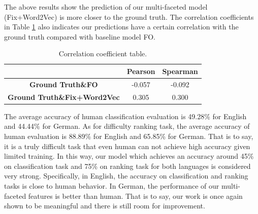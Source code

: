 The above results show the prediction of our multi-faceted model (Fix+Word2Vec) is more closer to the ground truth.
The correlation coefficients in Table \ref{tab:coefficients} also indicates our predictions have a certain correlation with the ground truth compared with baseline model FO.
\begin{table}[th]
	\centering
	\scriptsize
	\begin{tabular}{|c|c|c|}
		\hline
		& \textbf{Pearson} & \textbf{Spearman} \\ \hline
		\textbf{Ground Truth\&FO} & -0.057 & -0.092 \\ \hline
		\textbf{Ground Truth\&Fix+Word2Vec} & 0.305 & 0.300 \\ \hline
	\end{tabular}
	\vspace{-0.25cm}
	\caption{\label{tab:coefficients} Correlation coefficient table.}
\end{table}

The average accuracy of human classification evaluation is 49.28\% for English and 44.44\% for German.
As for difficulty ranking task, the average accuracy of human evaluation is 88.89\% for English and 65.85\% for German.
That is to say, it is a truly difficult task that even human can not achieve high accuracy given limited training. In this way, our model 
which achieves an accuracy around 45\% on classification task and 75\% on ranking task for both languages is considered very strong.
Specifically, in English, the accuracy on classification and ranking tasks is close to human behavior.
In German, the performance of our multi-faceted features is better than human.
That is to say, our work is once again shown to be meaningful and there is still room for improvement.


